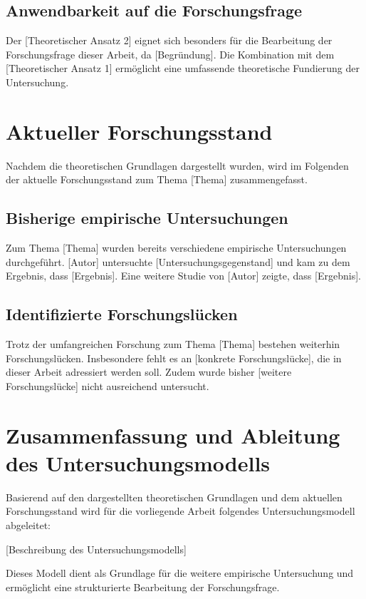 \subsection{Anwendbarkeit auf die Forschungsfrage}
\label{subsec:anwendbarkeit}

Der [Theoretischer Ansatz 2] eignet sich besonders für die Bearbeitung der Forschungsfrage dieser Arbeit, da [Begründung]. Die Kombination mit dem [Theoretischer Ansatz 1] ermöglicht eine umfassende theoretische Fundierung der Untersuchung.

\section{Aktueller Forschungsstand}
\label{sec:forschungsstand}

Nachdem die theoretischen Grundlagen dargestellt wurden, wird im Folgenden der aktuelle Forschungsstand zum Thema [Thema] zusammengefasst.

\subsection{Bisherige empirische Untersuchungen}
\label{subsec:bisherige_untersuchungen}

Zum Thema [Thema] wurden bereits verschiedene empirische Untersuchungen durchgeführt. [Autor] untersuchte [Untersuchungsgegenstand] und kam zu dem Ergebnis, dass [Ergebnis]. Eine weitere Studie von [Autor] zeigte, dass [Ergebnis].

\subsection{Identifizierte Forschungslücken}
\label{subsec:forschungsluecken}

Trotz der umfangreichen Forschung zum Thema [Thema] bestehen weiterhin Forschungslücken. Insbesondere fehlt es an [konkrete Forschungslücke], die in dieser Arbeit adressiert werden soll. Zudem wurde bisher [weitere Forschungslücke] nicht ausreichend untersucht.

\section{Zusammenfassung und Ableitung des Untersuchungsmodells}
\label{sec:zusammenfassung_modell}

Basierend auf den dargestellten theoretischen Grundlagen und dem aktuellen Forschungsstand wird für die vorliegende Arbeit folgendes Untersuchungsmodell abgeleitet:

[Beschreibung des Untersuchungsmodells]

Dieses Modell dient als Grundlage für die weitere empirische Untersuchung und ermöglicht eine strukturierte Bearbeitung der Forschungsfrage.
